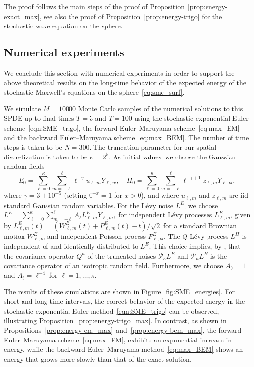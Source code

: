 \documentclass[11pt]{amsart}
\newcommand{\cP}{\mathcal{P}}
\begin{document}
\begin{appendixproof}
	The proof follows the main steps of the proof of Proposition~\ref{prop:energy-exact_max}, see also the
	proof of Proposition~\ref{prop:energy-trigo} for the stochastic wave equation on the sphere.
\end{appendixproof}

\subsection{Numerical experiments}\label{max-num}
We conclude this section with numerical experiments in order to support the above theoretical
results on the long-time behavior of the expected energy
of the stochastic Maxwell's equations on the sphere~\eqref{eq:sme_surf}.

We simulate $M=10000$ Monte Carlo samples of the numerical solutions to this SPDE up to final times $T=3$ and $T=100$ using
the stochastic exponential Euler scheme~\eqref{eqn:SME_trigo}, the forward Euler--Maruyama scheme~\eqref{eq:max_EM} and the backward Euler--Maruyama scheme~\eqref{eq:max_BEM}. The number of time steps is taken to be $N=300$.
The truncation parameter for our spatial discretization is taken to be $\kappa = 2^5$.
As initial values, we choose the Gaussian random fields
$$
E_0 = \sum_{\ell=0}^{\kappa} \sum_{m=-\ell}^{\ell} \ell^{-\gamma} u_{\ell , m} Y_{\ell , m}, \quad H_0 = \sum_{\ell=0}^{\kappa} \sum_{m=-\ell}^{\ell} \ell^{-\gamma+1} z_{\ell , m} Y_{\ell , m},
$$
where $\gamma=3+10^{-5}$ (setting $0^{-x}=1$ for $x>0$), and where $u_{\ell , m}$ and $z_{\ell , m}$ are iid standard Gaussian random variables.
For the L\' evy noise $L^E$,
we choose $L^E=\sum_{\ell=0}^{\kappa} \sum_{m=-\ell}^{\ell} A_\ell L^E_{\ell, m} Y_{\ell , m},$ for independent Lévy processes $L^E_{\ell,m}$,
given by $L^E_{\ell, m}(t) = \left(W^E_{\ell, m}(t) + P^E_{\ell, m}(t) - t\right) / \sqrt{2}$
for a standard Brownian motion $W^E_{\ell, m}$ and independent Poisson process $P^E_{\ell, m}$.
The $Q$-L\'evy process $L^H$ is independent of and identically distributed to $L^E$.
This choice implies, by \cite{marinucciRandomFieldsSphere2011a}, that the covariance operator $Q^\kappa$ of the truncated noises $\cP_\kappa L^E$ and $\cP_\kappa L^H$ is the covariance operator of an isotropic random field.
Furthermore, we choose $A_0 = 1$ and $A_\ell = \ell^{-4}$ for $\ell = 1, \dots, \kappa$. 

The results of these simulations are shown in Figure~\ref{fig:SME_energies}. For short and long time intervals, 
the correct behavior of the expected energy in the stochastic exponential Euler method~\eqref{eqn:SME_trigo} can be observed, illustrating Proposition~\ref{prop:energy-trigo_max}.
In contrast, as shown in Propositions~\ref{prop:energy-em_max}~and~\ref{prop:energy-bem_max}, the forward Euler--Maruyama scheme~\eqref{eq:max_EM}, exhibits an exponential increase in energy, while the backward Euler--Maruyama method~\eqref{eq:max_BEM}
shows an energy that grows more slowly than that of the exact solution.
\end{document}
